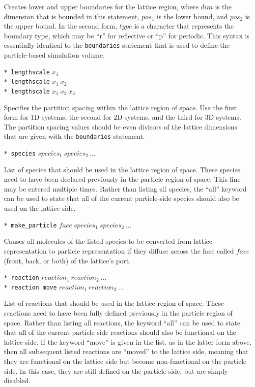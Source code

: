 \documentclass {scrbook}
\newcommand {\ttt} {\texttt}
\begin{document}
\begin{description}
Creates lower and upper boundaries for the lattice region, where $dim$ is the dimension that is bounded in this statement, $pos_1$ is the lower bound, and $pos_2$ is the upper bound. In the second form, $type$ is a character that represents the boundary type, which may be ``r'' for reflective or ``p'' for periodic. This syntax is essentially identical to the \ttt{boundaries} statement that is used to define the particle-based simulation volume.

\item{\ttt{* lengthscale} $x_1$\\
\ttt{* lengthscale} $x_1\ x_2$\\
\ttt{* lengthscale} $x_1\ x_2\ x_3$}

Specifies the partition spacing within the lattice region of space. Use the first form for 1D systems, the second for 2D systems, and the third for 3D systems. The partition spacing values should be even divisors of the lattice dimensions that are given with the \ttt{boundaries} statement.

\item{\ttt{* species} $species_1\ species_2\ ...$}

List of species that should be used in the lattice region of space. These species need to have been declared previously in the particle region of space. This line may be entered multiple times. Rather than listing all species, the ``all'' keyword can be used to state that all of the current particle-side species should also be used on the lattice side.

\item{\ttt{* make\_particle} $face\ species_1\ species_2\ ...$}

Causes all molecules of the listed species to be converted from lattice representation to particle representation if they diffuse across the face called $face$ (front, back, or both) of the lattice's port.

\item{\ttt{* reaction} $reaction_1\ reaction_2\ ...$\\
\ttt{* reaction move} $reaction_1\ reaction_2\ ...$}

List of reactions that should be used in the lattice region of space. These reactions need to have been fully defined previously in the particle region of space. Rather than listing all reactions, the keyword ``all'' can be used to state that all of the current particle-side reactions should also be functional on the lattice side. If the keyword ``move'' is given in the list, as in the latter form above, then all subsequent listed reactions are ``moved'' to the lattice side, meaning that they are functional on the lattice side but become non-functional on the particle side. In this case, they are still defined on the particle side, but are simply disabled.


\end{description}
\end{document}
